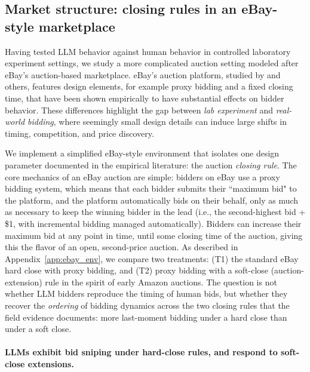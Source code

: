 \documentclass{article} %
\newif\ifmarkrev
\newcommand{\rev}[1]{\ifmarkrev\begingroup\color{red}#1\endgroup\else#1\fi}
\begin{document}
\subsection{\texorpdfstring{\rev{Market structure: closing rules in an eBay-style marketplace}}{Market structure: closing rules in an eBay-style marketplace}}\label{sec:ebay_market}


Having tested LLM behavior against human behavior in controlled laboratory experiment settings, we study a more complicated auction setting modeled after eBay's  auction-based marketplace. eBay's auction platform, studied by \citet{einav2011learning} and others, features design elements, \rev{for example proxy bidding and a fixed closing time}, that
have been shown empirically to have substantial effects on bidder behavior.
These differences highlight the gap between \textit{lab experiment} and \textit{real-world bidding}, where seemingly small design details can induce large shifts in timing, competition, and price discovery.

We implement a simplified eBay-style environment that isolates \rev{one design parameter documented in the empirical literature: the auction \emph{closing rule}}. The core mechanics of an eBay auction are simple: bidders on eBay use a proxy bidding system, which means that each bidder submits their ``maximum bid" to the platform, and the platform automatically bids on their behalf, only as much as necessary to keep the winning bidder in the lead (i.e., the second-highest bid + \$1, with incremental bidding managed automatically).
Bidders can increase their maximum bid at any point in time, until some closing time of
the auction, giving this the flavor
of an open, second-price auction.
\rev{As described in Appendix~\ref{app:ebay_env}, we compare two treatments: (T1) the standard eBay hard close with proxy bidding, and (T2) proxy bidding with a soft-close (auction-extension) rule in the spirit of early Amazon auctions. The question is not whether LLM bidders reproduce the timing of human bids, but whether they recover the \emph{ordering} of bidding dynamics across the two closing rules that the field evidence documents: more last-moment bidding under a hard close than under a soft close.}


\paragraph{\rev{LLMs exhibit bid sniping under hard-close rules, and respond to soft-close extensions.}}\label{sec:ebay_sniping}
\end{document}

